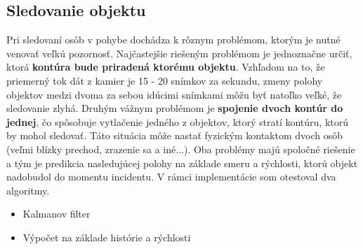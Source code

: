 \subsection{Sledovanie objektu}
Pri sledovaní osôb v pohybe dochádza k rôznym problémom, ktorým je nutné venovať veľkú pozornosť. Najčastejšie riešeným problémom je jednoznačne určiť, ktorá \textbf{kontúra bude priradená ktorému objektu}. Vzhľadom na to, že priemerný tok dát z kamier je 15 - 20 snímkov za sekundu, zmeny polohy objektov medzi dvoma za sebou idúcimi snímkami môžu byť natoľko veľké, že sledovanie zlyhá. Druhým vážnym problémom je \textbf{spojenie dvoch kontúr do jednej}, čo spôsobuje vytlačenie jedného z objektov, ktorý stratí kontúru, ktorú by mohol sledovať. Táto situácia môže nastať fyzickým kontaktom dvoch osôb (veľmi blízky prechod, zrazenie sa a iné...). Oba problémy majú spoločné riešenie a tým je predikcia nasledujúcej polohy na základe smeru a rýchlosti, ktorú objekt nadobudol do momentu incidentu.
V rámci implementácie som otestoval dva algoritmy.
\begin{itemize}
    \item Kalmanov filter
    \item Výpočet na základe histórie a rýchlosti
\end{itemize}


